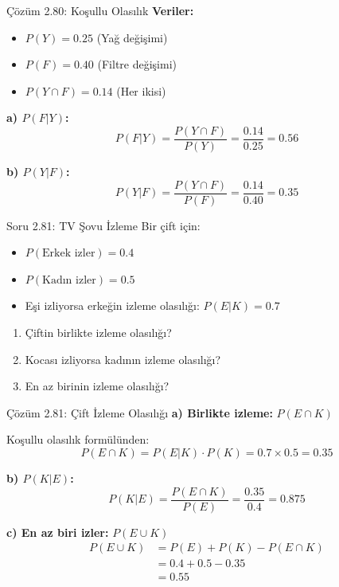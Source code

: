 \documentclass[light]{lutbeamer}
\begin{document}
\begin{frame}{Çözüm 2.80: Koşullu Olasılık}
    \color{blue}
    \textbf{Veriler:}
    \begin{itemize}
        \item $P(Y) = 0.25$ (Yağ değişimi)
        \item $P(F) = 0.40$ (Filtre değişimi)
        \item $P(Y \cap F) = 0.14$ (Her ikisi)
    \end{itemize}
    
    \vspace{0.3cm}
    \textbf{a) $P(F|Y)$:}
    \[ P(F|Y) = \frac{P(Y \cap F)}{P(Y)} = \frac{0.14}{0.25} = 0.56 \]
    
    \vspace{0.3cm}
    \textbf{b) $P(Y|F)$:}
    \[ P(Y|F) = \frac{P(Y \cap F)}{P(F)} = \frac{0.14}{0.40} = 0.35 \]
    
    \begin{center}
    \end{center}
\end{frame}

\begin{frame}{Soru 2.81: TV Şovu İzleme}
    Bir çift için:
    \begin{itemize}
        \item $P(\text{Erkek izler}) = 0.4$
        \item $P(\text{Kadın izler}) = 0.5$
        \item Eşi izliyorsa erkeğin izleme olasılığı: $P(E|K) = 0.7$
    \end{itemize}
    
    \begin{enumerate}
        \item Çiftin birlikte izleme olasılığı?
        \item Kocası izliyorsa kadının izleme olasılığı?
        \item En az birinin izleme olasılığı?
    \end{enumerate}
\end{frame}

\begin{frame}{Çözüm 2.81: Çift İzleme Olasılığı}
    \color{blue}
    \textbf{a) Birlikte izleme:} $P(E \cap K)$
    
    Koşullu olasılık formülünden:
    \[ P(E \cap K) = P(E|K) \cdot P(K) = 0.7 \times 0.5 = 0.35 \]
    
    \vspace{0.3cm}
    \textbf{b) $P(K|E)$:}
    \[ P(K|E) = \frac{P(E \cap K)}{P(E)} = \frac{0.35}{0.4} = 0.875 \]
    
    \vspace{0.3cm}
    \textbf{c) En az biri izler:} $P(E \cup K)$
    \begin{align*}
    P(E \cup K) &= P(E) + P(K) - P(E \cap K) \\
    &= 0.4 + 0.5 - 0.35 \\
    &= 0.55
    \end{align*}
\end{frame}
\end{document}

